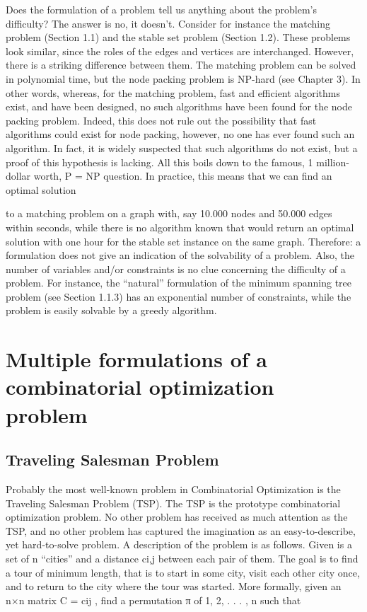 \documentclass[titlepage]{book}
\begin{document}
Does the formulation of a problem tell us anything about the problem's difficulty? The answer is no,
it doesn't. Consider for instance the matching problem (Section 1.1) and the stable set problem (Section 1.2). These problems look similar, since the roles of the edges and vertices are interchanged. However,
there is a striking difference between them. The matching problem can be solved in polynomial time, but
the node packing problem is NP-hard (see Chapter 3). In other words, whereas, for the matching problem, fast and efficient algorithms exist, and have been designed, no such algorithms have been found for
the node packing problem. Indeed, this does not rule out the possibility that fast algorithms could exist
for node packing, however, no one has ever found such an algorithm. In fact, it is widely suspected that
such algorithms do not exist, but a proof of this hypothesis is lacking. All this boils down to the famous,
1 million-dollar worth, P = NP question. In practice, this means that we can find an optimal solution

to a matching problem on a graph with, say 10.000 nodes and 50.000 edges within seconds, while there
is no algorithm known that would return an optimal solution with one hour for the stable set instance
on the same graph. Therefore: a formulation does not give an indication of the solvability of a problem.
Also, the number of variables and/or constraints is no clue concerning the difficulty of a problem. For
instance, the “natural” formulation of the minimum spanning tree problem (see Section 1.1.3) has an
exponential number of constraints, while the problem is easily solvable by a greedy algorithm.

\section{Multiple formulations of a combinatorial optimization problem}

\subsection{Traveling Salesman Problem}

Probably the most well-known problem in Combinatorial Optimization is the Traveling Salesman Problem
(TSP). The TSP is the prototype combinatorial optimization problem. No other problem has received as
much attention as the TSP, and no other problem has captured the imagination as an easy-to-describe,
yet hard-to-solve problem. A description of the problem is as follows. Given is a set of n “cities” and a
distance ci,j between each pair of them. The goal is to find a tour of minimum length, that is to start in
some city, visit each other city once, and to return to the city where the tour was started. More formally,
given an n×n matrix C = cij , find a permutation π of {1, 2, . . . , n} such that
\end{document}
